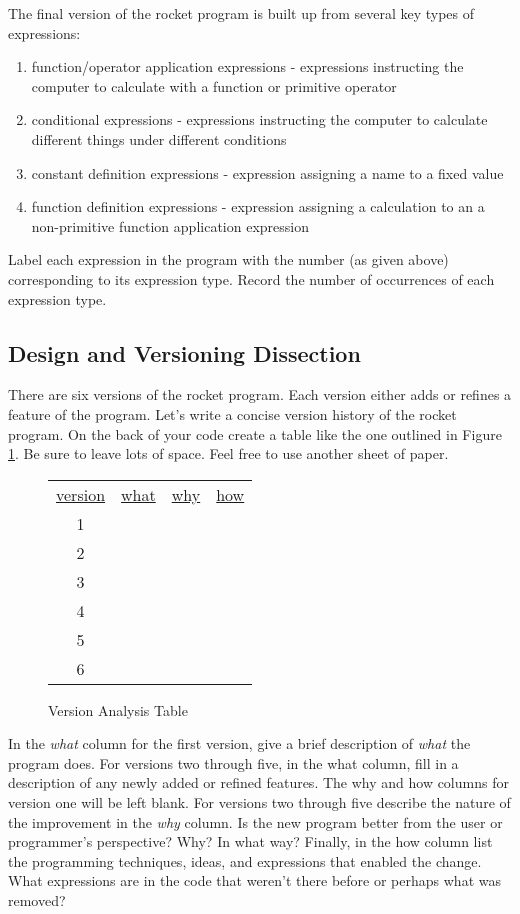 \documentclass[nobib]{tufte-handout}
\begin{document}
The final version of the rocket program is built up from several key types of expressions:
\begin{enumerate}
  \item function/operator application expressions - expressions instructing the computer to calculate with a function or primitive operator
  \item conditional expressions - expressions instructing the computer to calculate different things under different conditions
  \item constant definition expressions - expression assigning a name to a fixed value
  \item function definition expressions - expression assigning a calculation to an a non-primitive function application expression
\end{enumerate}
Label each expression in the program with the number (as given above) corresponding to its expression type. Record the number of occurrences of each expression type.

\subsection{Design and Versioning Dissection}

There are six versions of the rocket program. Each version either adds or refines a feature of the program. Let's write a concise version history of the rocket program.  On the back of your code create a table like the one outlined in Figure \ref{fig:vertab}. Be sure to leave lots of space. Feel free to use another sheet of paper.

\begin{figure}[ht]
  \center
  \begin{tabular}{cccc}
    \underline{version} & \underline{what} & \underline{why} & \underline{how} \\
    1 & & & \\
    2 & & & \\
    3 & & & \\
    4 & & & \\
    5 & & & \\
    6 & & &
  \end{tabular}
  \caption{Version Analysis Table}
  \label{fig:vertab}
\end{figure}

In the \textit{what} column for the first version, give a brief description of \textit{what} the program does. For versions two through five, in the what column, fill in a description of any newly added or refined features. The why and how columns for version one will be left blank. For versions two through five describe the nature of the improvement in the \textit{why} column. Is the new program better from the user or programmer's perspective? Why? In what way? Finally, in the how column list the programming techniques, ideas, and expressions that enabled the change. What expressions are in the code that weren't there before or perhaps what was removed?
\end{document}

